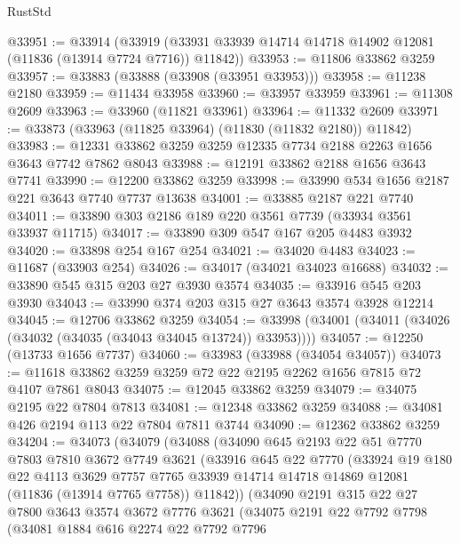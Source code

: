 \begin{lexlean}{RustStd}
\begin{coremodule}
@33951 := @33914
    (@33919 (@33931 @33939 @14714 @14718 @14902 @12081 (@11836 (@13914 @7724 @7716)) @11842))
@33953 := @11806 @33862 @3259
@33957 := @33883 (@33888 (@33908 (@33951 @33953)))
@33958 := @11238 @2180
@33959 := @11434 @33958
@33960 := @33957 @33959
@33961 := @11308 @2609
@33963 := @33960 (@11821 @33961)
@33964 := @11332 @2609
@33971 := @33873 (@33963 (@11825 @33964) (@11830 (@11832 @2180)) @11842)
@33983 := @12331 @33862 @3259 @3259 @12335 @7734 @2188 @2263 @1656 @3643 @7742 @7862 @8043
@33988 := @12191 @33862 @2188 @1656 @3643 @7741
@33990 := @12200 @33862 @3259
@33998 := @33990 @534 @1656 @2187 @221 @3643 @7740 @7737 @13638
@34001 := @33885 @2187 @221 @7740
@34011 := @33890 @303 @2186 @189 @220 @3561 @7739 (@33934 @3561 @33937 @11715)
@34017 := @33890 @309 @547 @167 @205 @4483 @3932
@34020 := @33898 @254 @167 @254
@34021 := @34020 @4483
@34023 := @11687 (@33903 @254)
@34026 := @34017 (@34021 @34023 @16688)
@34032 := @33890 @545 @315 @203 @27 @3930 @3574
@34035 := @33916 @545 @203 @3930
@34043 := @33990 @374 @203 @315 @27 @3643 @3574 @3928 @12214
@34045 := @12706 @33862 @3259
@34054 := @33998 (@34001 (@34011 (@34026 (@34032 (@34035 (@34043 @34045 @13724)) @33953))))
@34057 := @12250 (@13733 @1656 @7737)
@34060 := @33983 (@33988 (@34054 @34057))
@34073 := @11618 @33862 @3259 @3259 @72 @22 @2195 @2262 @1656 @7815 @72 @4107 @7861 @8043
@34075 := @12045 @33862 @3259
@34079 := @34075 @2195 @22 @7804 @7813
@34081 := @12348 @33862 @3259
@34088 := @34081 @426 @2194 @113 @22 @7804 @7811 @3744
@34090 := @12362 @33862 @3259
@34204 := @34073
    (@34079
      (@34088
        (@34090
          @645
          @2193
          @22
          @51
          @7770
          @7803
          @7810
          @3672
          @7749
          @3621
          (@33916
            @645
            @22
            @7770
            (@33924
              @19
              @180
              @22
              @4113
              @3629
              @7757
              @7765
              @33939
              @14714
              @14718
              @14869
              @12081
              (@11836 (@13914 @7765 @7758))
              @11842))
          (@34090
            @2191
            @315
            @22
            @27
            @7800
            @3643
            @3574
            @3672
            @7776
            @3621
            (@34075
              @2191
              @22
              @7792
              @7798
              (@34081
                @1884
                @616
                @2274
                @22
                @7792
                @7796

\end{coremodule}
\end{lexlean}
